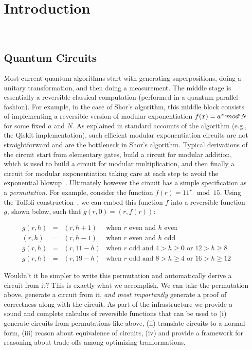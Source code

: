 \section{Introduction}~\label{sec:introduction}


\subsection*{Quantum Circuits}

Most current quantum algorithms start with generating superpositions, doing a unitary transformation, and then doing a measurement. The middle stage is essentially a reversible classical computation (performed in a quantum-parallel fashion). For example, in the case of Shor's algorithm, this middle block consists of implementing a reversible version of modular exponentiation $f(x) = a^x `mod` N$ for some fixed $a$ and $N$. As explained in standard accounts of the algorithm (e.g., the Qiskit implementation), such efficient modular exponentiation circuits are not straightforward and are the bottleneck in Shor’s algorithm. Typical derivations of the circuit start from elementary gates, build a circuit for modular addition, which is used to build a circuit for modular multiplication, and then finally a circuit for modular exponentiation taking care at each step to avoid the exponential blowup~\cite{shorefficient}. Ultimately however the circuit has a simple specification as a \emph{permutation}. For example, consider the function $f(r) = 11^{r} \mod 15$. Using the Toffoli construction~\cite{Toffoli:1980}, we can embed this function $f$ into a reversible function $g$, shown below, such that $g(r,0) = (r,f(r))$:

\[\begin{array}{rcll}
g(r,h) &=& (r,h+1) & \mbox{when~$r$~even~and~$h$~even} \\
(r,h) &=& (r,h-1) & \mbox{when~$r$~even~and~$h$~odd} \\
g(r,h) &=& (r,11-h) & \mbox{when~$r$~odd~and~$4 > h \geq 0$~or~$12 > h \geq 8$} \\
g(r,h) &=& (r,19-h) & \mbox{when~$r$~odd~and~$8 > h \geq 4$~or~$16 > h \geq 12$}
\end{array}\]

Wouldn't it be simpler to write this permutation and automatically derive a circuit from it? This is exactly what we accomplish. We can take the permutation above, generate a circuit from it, \emph{and most importantly} generate a proof of correctness along with the circuit. As part of the infrastructure we provide a sound and complete calculus of reversible functions that can be used to (i) generate circuits from permutations like above, (ii) translate circuits to a normal form, (iii) reason about equivalence of circuits, (iv) and provide a framework for reasoning about trade-offs among optimizing tranformations.

